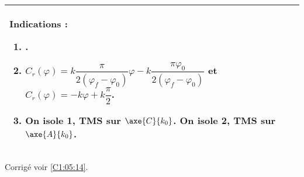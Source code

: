 \ifprof
\else
\ifcolle
\else
\footnotesize
\begin{center}
\begin{tabular}{|p{.9\linewidth}|}
\hline
Indications :
\begin{enumerate}
\item .
\item $C_r(\varphi)= k \dfrac{\pi}{2 \left(\varphi_f  -\varphi_0\right)}\varphi - k \dfrac{\pi \varphi_0}{2 \left(\varphi_f  -\varphi_0\right)} $ et 
$C_r(\varphi)= -k \varphi + k \dfrac{\pi}{2} $.
\item On isole 1, TMS sur $\axe{C}{k_0}$. On isole 2, TMS sur $\axe{A}{k_0}$.
\end{enumerate} \\ \hline
\end{tabular}
\end{center}
\normalsize
\fi

\begin{flushright}
\footnotesize{Corrigé  voir \ref{C1:05:14}.}
\end{flushright}%
\fi